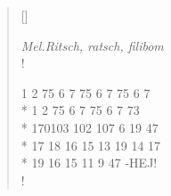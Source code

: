 
\settowidth{\versewidth}{1 2 75 6 7}



\begin{verse}[\versewidth]

\flagverse{}
\emph{Mel.Ritsch, ratsch, filibom}\\!



1 2 75 6 7 75 6 7 75 6 7\\*
1 2 75 6 7 75 6 7 73 \\*
170103 102 107 6 19 47\\*
17 18 16 15 13 19 14 17\\*
19 16 15 11 9 47 -HEJ!\\!




\end{verse}

